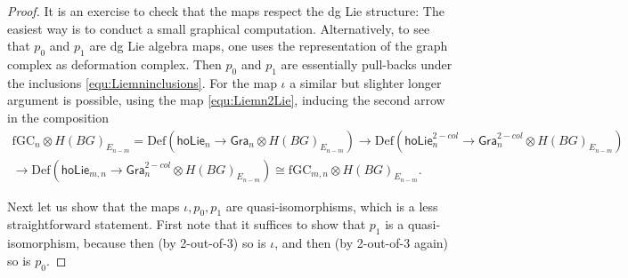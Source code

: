 \documentclass[a4paper]{amsart}
\theoremstyle{plain}
\theoremstyle{definition}
\newcommand{\Gra}{{\mathsf{Gra}}}
\newcommand{\Def}{\mathrm{Def}}
\newcommand{\hoLie}{\mathsf{hoLie}}
\newcommand{\fGC}{\mathrm{fGC}}
\begin{document}
\begin{proof}
It is an exercise to check that the maps respect the dg Lie structure:
The easiest way is to conduct a small graphical computation. Alternatively, to see that $p_0$ and $p_1$ are dg Lie algebra maps, one uses the representation of the graph complex as deformation complex. Then $p_0$ and $p_1$ are essentially pull-backs under the inclusions \eqref{equ:Liemninclusions}.
For the map $\iota$ a similar but slighter longer argument is possible, using the map \eqref{equ:Liemn2Lie}, inducing the second arrow in the composition
\begin{multline*}
 \fGC_{n}\otimes H(BG)_{E_{n-m}}= \Def(\hoLie_n\to \Gra_n\otimes H(BG)_{E_{n-m}})
\to \Def(\hoLie^{2-col}_n\to \Gra_n^{2-col}\otimes H(BG)_{E_{n-m}})
\\
\to 
\Def(\hoLie_{m,n}\to \Gra_n^{2-col}\otimes H(BG)_{E_{n-m}}) \cong \fGC_{m,n}\otimes H(BG)_{E_{n-m}}.
\end{multline*}


 
Next let us show that the maps $\iota, p_0, p_1$ are quasi-isomorphisms, which is a less straightforward statement.
First note that it suffices to show that $p_1$ is a quasi-isomorphism, because then (by 2-out-of-3) so is $\iota$, and then (by 2-out-of-3 again) so is $p_0$.


\end{proof}
\end{document}
